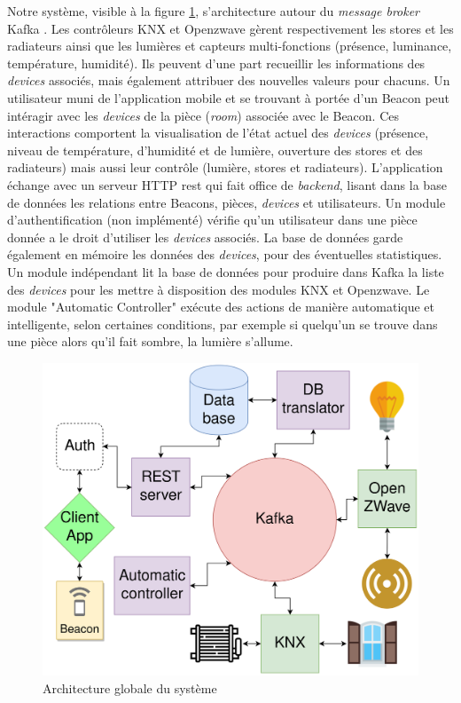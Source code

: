 Notre système, visible à la figure \ref{architecture}, s'architecture autour du \textit{message broker} Kafka \cite{kafka}. Les contrôleurs KNX et Openzwave gèrent respectivement les stores et les radiateurs ainsi que les lumières et capteurs multi-fonctions (présence, luminance, température, humidité). Ils peuvent d'une part recueillir les informations des \textit{devices} associés, mais également attribuer des nouvelles valeurs pour chacuns. Un utilisateur muni de l'application mobile et se trouvant à portée d'un Beacon peut intéragir avec les \textit{devices} de la pièce (\textit{room}) associée avec le Beacon. Ces interactions comportent la visualisation de l'état actuel des \textit{devices} (présence, niveau de température, d'humidité et de lumière, ouverture des stores et des radiateurs) mais aussi leur contrôle (lumière, stores et radiateurs). L'application échange avec un serveur HTTP \acrshort{rest} qui fait office de \textit{backend}, lisant dans la base de données les relations entre Beacons, pièces, \textit{devices} et utilisateurs. Un module d'authentification (non implémenté) vérifie qu'un utilisateur dans une pièce donnée a le droit d'utiliser les \textit{devices} associés. La base de données garde également en mémoire les données des \textit{devices}, pour des éventuelles statistiques. Un module indépendant lit la base de données pour produire dans Kafka la liste des \textit{devices}  pour les mettre à disposition des modules KNX et Openzwave. Le module "Automatic Controller" exécute des actions de manière automatique et intelligente, selon certaines conditions, par exemple si quelqu'un se trouve dans une pièce alors qu'il fait sombre, la lumière s'allume.

\begin{figure}
    \begin{center}
        \includegraphics[width=1\textwidth]{img/architecture.png}
    \end{center}
    \caption{Architecture globale du système}
    \label{architecture}
\end{figure}
